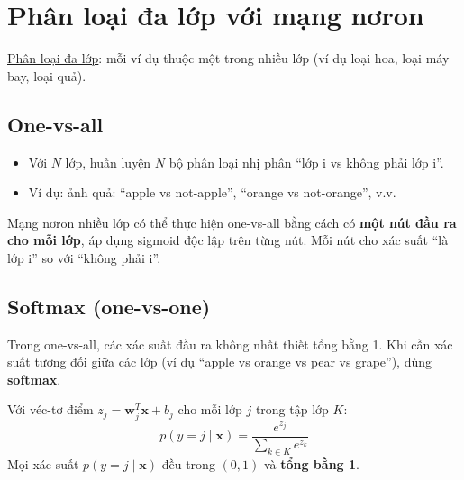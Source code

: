 \documentclass[12pt,a4paper]{article}
\begin{document}
\section{Phân loại đa lớp với mạng nơron}

\begin{dinhnghia}[title={Bài toán đa lớp}]
\href{https://developers.google.com/machine-learning/glossary\#multi-class}{Phân loại đa lớp}: mỗi ví dụ thuộc một trong nhiều lớp (ví dụ loại hoa, loại máy bay, loại quả).
\end{dinhnghia}

\subsection{One-vs-all}

\begin{phuongphap}[title={Nhiều bộ phân loại nhị phân}]
\begin{itemize}
  \item Với $N$ lớp, huấn luyện $N$ bộ phân loại nhị phân ``lớp i vs không phải lớp i''.
  \item Ví dụ: ảnh quả: ``apple vs not-apple'', ``orange vs not-orange'', v.v.
\end{itemize}
\end{phuongphap}

\begin{vidu}[title={One-vs-all với mạng nơron}]
Mạng nơron nhiều lớp có thể thực hiện one-vs-all bằng cách có \textbf{một nút đầu ra cho mỗi lớp}, áp dụng sigmoid độc lập trên từng nút. Mỗi nút cho xác suất ``là lớp i'' so với ``không phải i''.
\end{vidu}

\subsection{Softmax (one-vs-one)}

\begin{dongco}[title={Vấn đề tổng xác suất}]
Trong one-vs-all, các xác suất đầu ra không nhất thiết tổng bằng 1. Khi cần xác suất tương đối giữa các lớp (ví dụ ``apple vs orange vs pear vs grape''), dùng \textbf{softmax}.
\end{dongco}

\begin{dinhnghia}[title={Softmax}]
Với véc-tơ điểm $z_j = \boldsymbol w_j^T\boldsymbol x + b_j$ cho mỗi lớp $j$ trong tập lớp $K$:
\[
  p(y=j\mid\boldsymbol x) = \frac{e^{z_j}}{\sum_{k\in K} e^{z_k}}
\]
Mọi xác suất $p(y=j\mid\boldsymbol x)$ đều trong $(0,1)$ và \textbf{tổng bằng 1}.
\end{dinhnghia}
\end{document}
